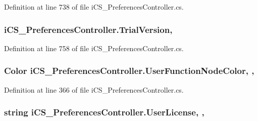 Definition at line 738 of file i\+C\+S\+\_\+\+Preferences\+Controller.\+cs.

\hypertarget{classi_c_s___preferences_controller_a8dab83d50ea7ace907036bf981065119}{
\subsubsection[{Trial\+Version}]{ i\+C\+S\+\_\+\+Preferences\+Controller.\+Trial\+Version\hspace{0.3cm}{\ttfamily [static]}, {\ttfamily [get]}}}\label{classi_c_s___preferences_controller_a8dab83d50ea7ace907036bf981065119}


Definition at line 758 of file i\+C\+S\+\_\+\+Preferences\+Controller.\+cs.

\hypertarget{classi_c_s___preferences_controller_ae939aa09249b451b7ddb92c272c89aea}{
\subsubsection[{User\+Function\+Node\+Color}]{\setlength{\rightskip}{0pt plus 5cm}Color i\+C\+S\+\_\+\+Preferences\+Controller.\+User\+Function\+Node\+Color\hspace{0.3cm}{\ttfamily [static]}, {\ttfamily [get]}, {\ttfamily [set]}}}\label{classi_c_s___preferences_controller_ae939aa09249b451b7ddb92c272c89aea}


Definition at line 366 of file i\+C\+S\+\_\+\+Preferences\+Controller.\+cs.

\hypertarget{classi_c_s___preferences_controller_aae7d9b5f57b639d5670a17361661ea01}{
\subsubsection[{User\+License}]{\setlength{\rightskip}{0pt plus 5cm}string i\+C\+S\+\_\+\+Preferences\+Controller.\+User\+License\hspace{0.3cm}{\ttfamily [static]}, {\ttfamily [get]}, {\ttfamily [set]}}}\label{classi_c_s___preferences_controller_aae7d9b5f57b639d5670a17361661ea01}


